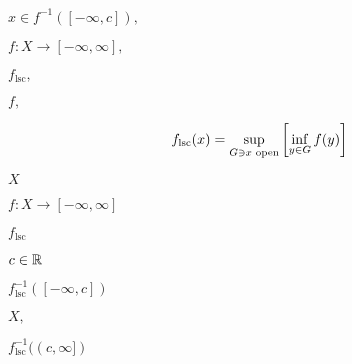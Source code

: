 \documentclass[10pt]{book}
\begin{document}
\begin{mdSnippets}
\begin{mdInlineSnippet}[461478f20cb52861ec677e2b3029eef8]%
$x \in f^{-1}([-\infty, c]),$\end{mdInlineSnippet}%
\begin{mdInlineSnippet}%
$f: X \to [-\infty, \infty],$\end{mdInlineSnippet}%
\begin{mdInlineSnippet}[c7ae4e1c30f72247767a2cdc193de4ec]%
$f_\text{lsc},$\end{mdInlineSnippet}%
\begin{mdInlineSnippet}[0e05bed100c5460dd523f83322b3e4d7]%
$f,$\end{mdInlineSnippet}%
\begin{mdDisplaySnippet}[c6054d0f8b02754c25bdb53421a42bd4]%
\[%
f_\text{lsc}(x) = \sup_{G \ni x \text{ open}} \qty[\inf_{y \in G} f(y)]
\]%
\end{mdDisplaySnippet}%
\begin{mdInlineSnippet}[02129bb861061d1a052c592e2dc6b383]%
$X$\end{mdInlineSnippet}%
\begin{mdInlineSnippet}[9c3729f1b2ef77b97bbdb1135d803c69]%
$f: X \to [-\infty, \infty]$\end{mdInlineSnippet}%
\begin{mdInlineSnippet}[4a08201c96014391857403079b385a9d]%
$f_\text{lsc}$\end{mdInlineSnippet}%
\begin{mdInlineSnippet}%
$c \in \mathbb{R}$\end{mdInlineSnippet}%
\begin{mdInlineSnippet}%
$f_\text{lsc}^{-1}([-\infty, c])$\end{mdInlineSnippet}%
\begin{mdInlineSnippet}[412bd1def2f1b61da9169d88e6c8b9e9]%
$X,$\end{mdInlineSnippet}%
\begin{mdInlineSnippet}[9a7859563ae8bcfe2b67b09eb067e6f0]%
$f_\text{lsc}^{-1}((c, \infty])$\end{mdInlineSnippet}%
\begin{mdInlineSnippet}[dda33429d47a479bd58c90c028c6a8dc]%

\end{mdInlineSnippet}
\end{mdSnippets}
\end{document}
